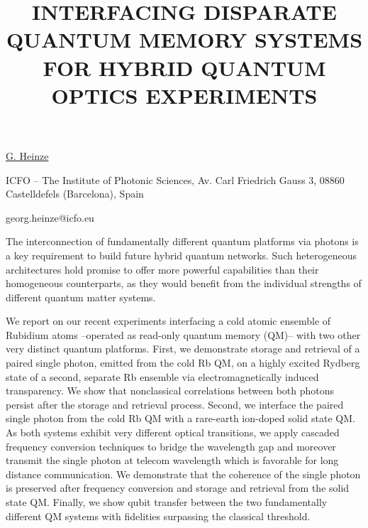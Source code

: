 \title{INTERFACING DISPARATE QUANTUM MEMORY SYSTEMS FOR HYBRID QUANTUM OPTICS EXPERIMENTS}

\underline{G. Heinze} 

{\normalsize{\vspace{-4mm}
ICFO -- The Institute of Photonic Sciences,
Av. Carl Friedrich Gauss 3,
08860 Castelldefels (Barcelona), Spain

\email georg.heinze@icfo.eu}}

The interconnection of fundamentally different quantum platforms via photons is a key requirement to build future hybrid quantum networks. Such heterogeneous architectures hold promise to offer more powerful capabilities than their homogeneous counterparts, as they would benefit from the individual strengths of different quantum matter systems.

We report on our recent experiments interfacing a cold atomic ensemble of Rubidium atoms –operated as read-only quantum memory (QM)– with two other very distinct quantum platforms. First, we demonstrate storage and retrieval of a paired single photon, emitted from the cold Rb QM, on a highly excited Rydberg state of a second, separate Rb ensemble via electromagnetically induced transparency. We show that nonclassical correlations between both photons persist after the storage and retrieval process. Second, we interface the paired single photon from the cold Rb QM with a rare-earth ion-doped solid state QM. As both systems exhibit very different optical transitions, we apply cascaded frequency conversion techniques to bridge the wavelength gap and moreover transmit the single photon at telecom wavelength which is favorable for long distance communication. We demonstrate that the coherence of the single photon is preserved after frequency conversion and storage and retrieval from the solid state QM. Finally, we show qubit transfer between the two fundamentally different QM systems with fidelities surpassing the classical threshold.

\vspace{\baselineskip} 